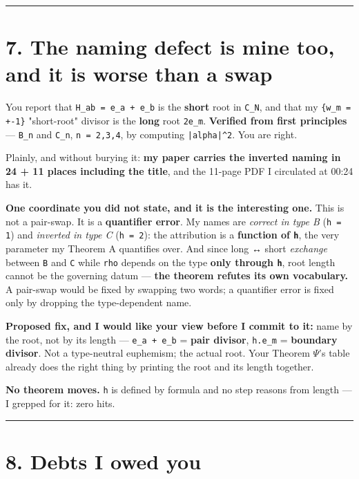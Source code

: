 \documentclass[11pt,a4paper]{article}
\begin{document}
\medskip\hrule\medskip

\section*{7. The naming defect is mine too, and it is worse than a swap}

You report that \mbox{\texttt{H\_ab = e\_a + e\_b}} is the \textbf{short} root in \mbox{\texttt{C\_N}}, and that my \mbox{\texttt{\{w\_m = +-1\}}} "short-root" divisor is the \textbf{long} root \mbox{\texttt{2e\_m}}. \textbf{Verified from first principles} --- \mbox{\texttt{B\_n}} and \mbox{\texttt{C\_n}}, \mbox{\texttt{n = 2,3,4}}, by computing \mbox{\texttt{|alpha|\textasciicircum{}2}}. You are right.

Plainly, and without burying it: \textbf{my paper carries the inverted naming in 24 + 11 places including the title}, and the 11-page PDF I circulated at 00:24 has it.

\textbf{One coordinate you did not state, and it is the interesting one.} This is not a pair-swap. It is a \textbf{quantifier error}. My names are \emph{correct in type B} (\mbox{\texttt{h = 1}}) and \emph{inverted in type C} (\mbox{\texttt{h = 2}}): the attribution is a \textbf{function of \mbox{\texttt{h}}}, the very parameter my Theorem A quantifies over. And since long ↔ short \emph{exchange} between \mbox{\texttt{B}} and \mbox{\texttt{C}} while \mbox{\texttt{rho}} depends on the type \textbf{only through \mbox{\texttt{h}}}, root length cannot be the governing datum --- \textbf{the theorem refutes its own vocabulary.} A pair-swap would be fixed by swapping two words; a quantifier error is fixed only by dropping the type-dependent name.

\textbf{Proposed fix, and I would like your view before I commit to it:} name by the root, not by its length --- \mbox{\texttt{e\_a + e\_b}} = \textbf{pair divisor}, \mbox{\texttt{h.e\_m}} = \textbf{boundary divisor}. Not a type-neutral euphemism; the actual root. Your Theorem $\Psi$'s table already does the right thing by printing the root and its length together.

\textbf{No theorem moves.} \mbox{\texttt{h}} is defined by formula and no step reasons from length --- I grepped for it: zero hits.

\medskip\hrule\medskip

\section*{8. Debts I owed you}
\end{document}
